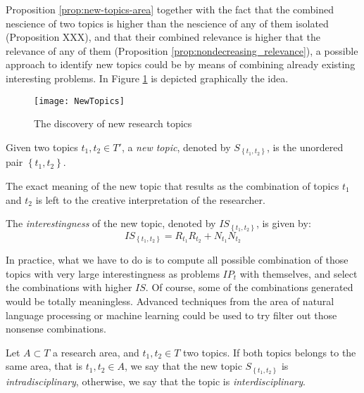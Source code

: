 Proposition \ref{prop:new-topics-area} together with the fact that the combined nescience of two topics is higher than the nescience of any of them isolated (Proposition {\color{red} XXX}), and that their combined relevance is higher that the relevance of any of them (Proposition \ref{prop:nondecreasing_relevance}), a possible approach to identify new topics could be by means of combining already existing interesting problems. In Figure \ref{fig:New-Topics} is depicted graphically the idea.

\begin{figure}[h]
\centering\texttt{[image: NewTopics]}
\caption{\label{fig:New-Topics}The discovery of new research topics}
\end{figure}

\begin{definition}
Given two topics $t_{1}, t_{2} \in T'$, a \emph{new topic}, denoted by $S_{\left\{ t_{1},t_{2}\right\}}$, is the unordered pair $\left\{ t_{1},t_{2}\right\}$.
\end{definition}

The exact meaning of the new topic that results as the combination of topics $t_{1}$ and $t_{2}$ is left to the creative interpretation of the researcher.

\begin{definition}
The \emph{interestingness} of the new topic, denoted by $IS_{\left\{ t_{1},t_{2}\right\} }$, is given by:
\[
IS_{\left\{ t_{1},t_{2}\right\} } = R_{t_{1}}R_{t_{2}}+N_{t_{1}}N_{t_{2}}
\]
\end{definition}

In practice, what we have to do is to compute all possible combination of those topics with very large interestingness as problems $IP_{t}$ with themselves, and select the combinations with higher $IS$. Of course, some of the combinations generated would be totally meaningless. Advanced techniques from the area of natural language processing or machine learning could be used to try filter out those nonsense combinations.

\begin{definition} 
Let $A \subset T$ a research area, and $t_{1}, t_{2} \in T$ two topics. If both topics belongs to the same area, that is $t_{1}, t_{2} \in A$, we say that the new topic $S_{\left\{ t_{1},t_{2}\right\} }$ is \emph{intradisciplinary}, otherwise, we say that the topic is \emph{interdisciplinary}.
\end{definition}

